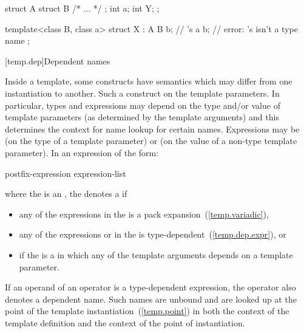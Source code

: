 \begin{codeblock}
struct A {
  struct B { /* ... */ };
  int a;
  int Y;
};

template<class B, class a> struct X : A {
  B b;              // 's 
  a b;              // error: 's  isn't a type name
};
\end{codeblock}
\exitexample

[temp.dep]{Dependent names}

\pnum
{}%
Inside a template, some constructs have semantics which may differ from one
instantiation to another.
Such a construct
on the template parameters.
In particular, types and expressions may depend on the type
and/or
value of
template parameters (as determined by the template arguments) and this determines
the context for name lookup for certain names.
Expressions may be
(on the type of a template parameter) or
(on the value of a non-type template parameter).
In an expression of the form:

\begin{ncbnftab}
postfix-expression \terminal{(} expression-list\opt \terminal{)}
\end{ncbnftab}

where the
is an
,
the
denotes a
%
if

\begin{itemize}
\item 
any of the expressions in the  is a pack
expansion~(\ref{temp.variadic}),

\item
any of the expressions
or 
in the
is type-dependent~(\ref{temp.dep.expr}), or

\item
if the 
is a  in which any of the template arguments depends
on a template parameter.
\end{itemize}

If an operand of an operator is a type-dependent expression, the operator
also denotes a dependent name.
Such names are unbound and
are looked up at the point of the template instantiation~(\ref{temp.point}) in
both the context of the template definition and the
context of the point of instantiation.

